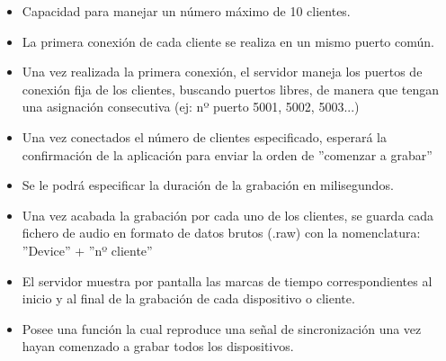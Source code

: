 \documentclass[a4paper,11pt]{book}
\begin{document}
				\begin{itemize}
				\item Capacidad para manejar un número máximo de 10 clientes.
				\item La primera conexión de cada cliente se realiza en un mismo puerto común.
				\item Una vez realizada la primera conexión, el servidor maneja los puertos de conexión fija de los clientes, buscando puertos libres, de manera que tengan una asignación consecutiva (ej: nº puerto 5001, 5002, 5003...)
				\item Una vez conectados el número de clientes especificado, esperará la confirmación de la aplicación para enviar la orden de ''comenzar a grabar''
				\item Se le podrá especificar la duración de la grabación en milisegundos.
				\item Una vez acabada la grabación por cada uno de los clientes, se guarda cada fichero de audio en formato de datos brutos (.raw) con la nomenclatura: ''Device'' + ''nº cliente''
				\item El servidor muestra por pantalla las marcas de tiempo correspondientes al inicio y al final de la grabación de cada dispositivo o cliente.
				\item Posee una función la cual reproduce una señal de sincronización una vez hayan comenzado a grabar todos los dispositivos.
				\end{itemize}
			
\end{document}
